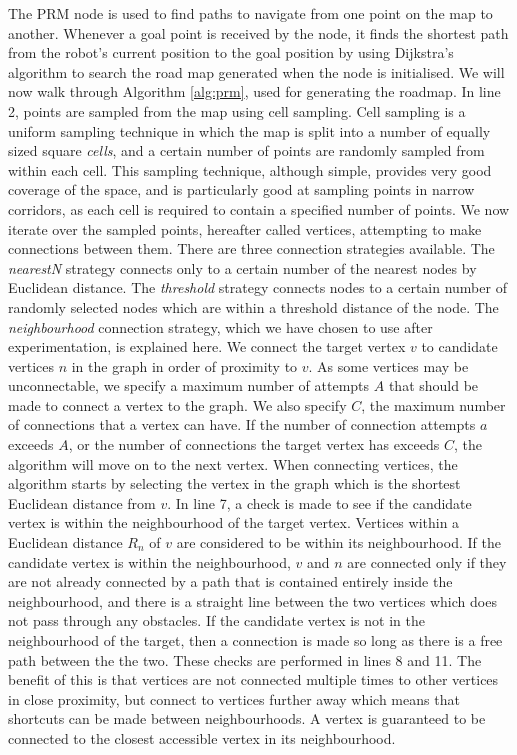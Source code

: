 \documentclass[conference]{IEEEtran}
\begin{document}
The PRM node is used to find paths to navigate from one point on the map to another. Whenever a goal point is received by the node, it finds the shortest path from the robot's current position to the goal position by using Dijkstra's algorithm to search the road map generated when the node is initialised. We will now walk through Algorithm \ref{alg:prm}, used for generating the roadmap. In line 2, points are sampled from the map using cell sampling. Cell sampling is a uniform sampling technique in which the map is split into a number of equally sized square \emph{cells}, and a certain number of points are randomly sampled from within each cell. This sampling technique, although simple, provides very good coverage of the space, and is particularly good at sampling points in narrow corridors, as each cell is required to contain a specified number of points. We now iterate over the sampled points, hereafter called vertices, attempting to make connections between them. There are three connection strategies available. The \emph{nearestN} strategy connects only to a certain number of the nearest nodes by Euclidean distance. The \emph{threshold} strategy connects nodes to a certain number of randomly selected nodes which are within a threshold distance of the node. The \emph{neighbourhood} connection strategy, which we have chosen to use after experimentation, is explained here. We connect the target vertex $v$ to candidate vertices $n$ in the graph in order of proximity to $v$. As some vertices may be unconnectable, we specify a maximum number of attempts $A$ that should be made to connect a vertex to the graph. We also specify $C$, the maximum number of connections that a vertex can have. If the number of connection attempts $a$ exceeds $A$, or the number of connections the target vertex has exceeds $C$, the algorithm will move on to the next vertex. When connecting vertices, the algorithm starts by selecting the vertex in the graph which is the shortest Euclidean distance from $v$. In line 7, a check is made to see if the candidate vertex is within the neighbourhood of the target vertex. Vertices within a Euclidean distance $R_n$ of $v$ are considered to be within its neighbourhood. If the candidate vertex is within the neighbourhood, $v$ and $n$ are connected only if they are not already connected by a path that is contained entirely inside the neighbourhood, and there is a straight line between the two vertices which does not pass through any obstacles. If the candidate vertex is not in the neighbourhood of the target, then a connection is made so long as there is a free path between the the two. These checks are performed in lines 8 and 11. The benefit of this is that vertices are not connected multiple times to other vertices in close proximity, but connect to vertices further away which means that shortcuts can be made between neighbourhoods. A vertex is guaranteed to be connected to the closest accessible vertex in its neighbourhood.
\end{document}
